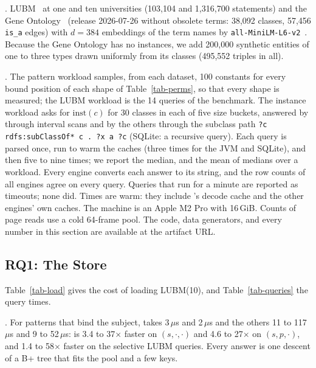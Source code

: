 .
LUBM~\cite{lubm} at one and ten universities (103,104 and 1,316,700
statements) and the Gene Ontology~\cite{ashburner2000} (release 2026-07-26
without obsolete terms: 38,092 classes, 57,456 \texttt{is\_a} edges) with
$d=384$ embeddings of the term names by
\texttt{all-MiniLM-L6-v2}~\cite{reimers2019}.
Because the Gene Ontology has no instances, we add 200,000 synthetic
entities of one to three types drawn uniformly from its classes (495,552
triples in all).

.
The pattern workload samples, from each dataset, 100 constants for every
bound position of each shape of Table~\ref{tab-perms}, so that every shape is
measured; the LUBM workload is the 14 queries of the benchmark.
The instance workload asks for $\mathrm{inst}(c)$ for 30 classes in each of
five size buckets, answered by \sys through interval scans and by the others
through the subclass path \texttt{?c rdfs:subClassOf* c . ?x a ?c} (SQLite: a
recursive query).
Each query is parsed once, run to warm the caches (three times for the JVM and SQLite), and then five to nine times; we report the median, and the mean of
medians over a workload.
Every engine converts each answer to its string, and the row counts of all
engines agree on every query.
Queries that run for a minute are reported as timeouts; none did.
Times are warm: they include \sys's decode cache and the other engines' own
caches.
The machine is an Apple M2 Pro with 16\,GiB.
Counts of page reads use a cold 64-frame pool.
The code, data generators, and every number in this section are available
at the artifact URL.

\subsection{RQ1: The Store}

Table~\ref{tab-load} gives the cost of loading LUBM(10), and
Table~\ref{tab-queries} the query times.





.
For patterns that bind the subject, \sys takes 3\,$\mu$s and 2\,$\mu$s and the
others 11 to 117\,$\mu$s and 9 to 52\,$\mu$s: \sys is 3.4 to 37$\times$ faster
on $(s,\cdot,\cdot)$ and 4.6 to 27$\times$ on $(s,p,\cdot)$, and 1.4 to
58$\times$ faster on the selective LUBM queries.
Every answer is one descent of a B+ tree that fits the pool and a few keys.

